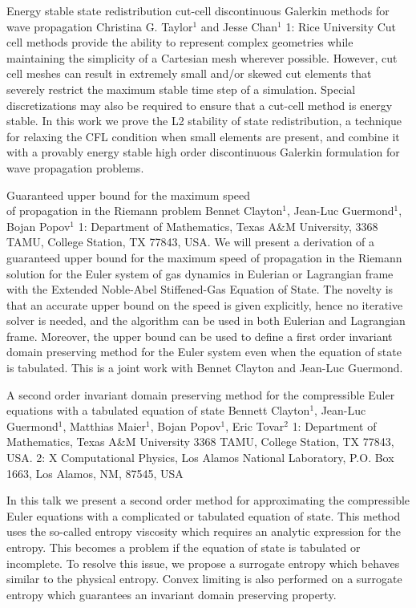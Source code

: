 \begin{addmargin}[2em]{0em}
\vspace{2ex}
\abs
{Energy stable state redistribution cut-cell discontinuous Galerkin methods for wave propagation}
{Christina G. Taylor$^{1}$ and Jesse Chan$^{1}$}
{1: Rice University}
{Cut cell methods provide the ability to represent complex geometries while maintaining the simplicity of a Cartesian mesh wherever possible. However, cut cell meshes can result in extremely small and/or skewed cut elements that severely restrict the maximum stable time step of a simulation. Special discretizations may also be required to ensure that a cut-cell method is energy stable. In this work we prove the L2 stability of state redistribution, a technique for relaxing the CFL condition when small elements are present, and combine it with a provably energy stable high order discontinuous Galerkin formulation for wave propagation problems.}


\vspace{1.5ex}
\abs
{Guaranteed upper bound for the maximum speed\\ of propagation in the Riemann problem}
{Bennet Clayton$^1$, Jean-Luc Guermond$^1$, Bojan Popov$^1$}
{1: Department of Mathematics, Texas A\&M University, 3368 TAMU, College Station, TX 77843, USA.}
{We will present a derivation of a guaranteed upper bound for the maximum speed of propagation in the Riemann solution for the Euler system of gas dynamics in Eulerian or Lagrangian frame with the Extended Noble-Abel Stiffened-Gas Equation of State. The novelty is that an accurate upper bound on the speed is given explicitly, hence no iterative solver is needed, and the algorithm can be used in both Eulerian and Lagrangian frame. Moreover, the upper bound can be used to define a first order invariant domain preserving method for the Euler system even when the equation of state is tabulated. 	This is a joint work with Bennet Clayton and Jean-Luc Guermond.}


\vspace{1.5ex}
\abs
{A second order invariant domain preserving method for the compressible Euler equations with a tabulated equation of state}
{Bennett Clayton$^{1}$, Jean-Luc Guermond$^{1}$, Matthias Maier$^{1}$, Bojan Popov$^{1}$, Eric Tovar$^{2}$}
{1: Department of Mathematics, Texas A\&M University 3368 TAMU, College Station, TX 77843, USA. 2: X Computational Physics, Los Alamos National Laboratory, P.O. Box 1663, Los Alamos, NM, 87545, USA}
{In this talk we present a second order method for approximating the compressible Euler equations with a complicated or tabulated equation of state. This method uses the so-called entropy viscosity which requires an analytic expression for the entropy. This becomes a problem if the equation of state is tabulated or incomplete. To resolve this issue, we propose a surrogate entropy which behaves similar to the physical entropy. Convex limiting is also performed on a surrogate entropy which guarantees an invariant domain preserving property.

}
\end{addmargin}
